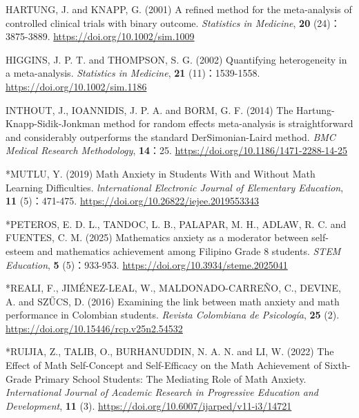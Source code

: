 \documentclass[
  lualatex, ja=standard, paper={182mm,257mm}, twocolumn, fontsize=8.5pt, baselineskip=13.5pt,
  line_length=24zw, column_gap=6.1mm, number_of_lines=45, head_space=24.5mm, gutter=16.25mm
]{jlreq}
\begin{document}
{\par\noindent{}\zw{} HARTUNG, J. and KNAPP, G. (2001) A refined method for the meta-analysis of controlled clinical trials with binary outcome. \textit{Statistics in Medicine}, \textbf{20} (24)：3875-3889. \url{https://doi.org/10.1002/sim.1009}\par
\par\noindent{}\zw{} HIGGINS, J. P. T. and THOMPSON, S. G. (2002) Quantifying heterogeneity in a meta-analysis. \textit{Statistics in Medicine}, \textbf{21} (11)：1539-1558. \url{https://doi.org/10.1002/sim.1186}\par
\par\noindent{}\zw{} INTHOUT, J., IOANNIDIS, J. P. A. and BORM, G. F. (2014) The Hartung-Knapp-Sidik-Jonkman method for random effects meta-analysis is straightforward and considerably outperforms the standard DerSimonian-Laird method. \textit{BMC Medical Research Methodology}, \textbf{14}：25. \url{https://doi.org/10.1186/1471-2288-14-25}\par
\par\noindent{}\zw{} *MUTLU, Y. (2019) Math Anxiety in Students With and Without Math Learning Difficulties. \textit{lnternational Electronic Journal of Elementary Education}, \textbf{11} (5)：471-475. \url{https://doi.org/10.26822/iejee.2019553343}\par
\par\noindent{}\zw{} *PETEROS, E. D. L., TANDOC, L. B., PALAPAR, M. H., ADLAW, R. C. and FUENTES, C. M. (2025) Mathematics anxiety as a moderator between self-esteem and mathematics achievement among Filipino Grade 8 students. \textit{STEM Education}, \textbf{5} (5)：933-953. \url{https://doi.org/10.3934/steme.2025041}\par
\par\noindent{}\zw{} *REALI, F., JIMÉNEZ-LEAL, W., MALDONADO-CARREÑO, C., DEVINE, A. and SZŰCS, D. (2016) Examining the link between math anxiety and math performance in Colombian students. \textit{Revista Colombiana de Psicología}, \textbf{25} (2). \url{https://doi.org/10.15446/rcp.v25n2.54532}\par
\par\noindent{}\zw{} *RUIJIA, Z., TALIB, O., BURHANUDDIN, N. A. N. and LI, W. (2022) The Effect of Math Self-Concept and Self-Efficacy on the Math Achievement of Sixth-Grade Primary School Students: The Mediating Role of Math Anxiety. \textit{International Journal of Academic Research in Progressive Education and Development}, \textbf{11} (3). \url{https://doi.org/10.6007/ijarped/v11-i3/14721}\par
}
\end{document}
